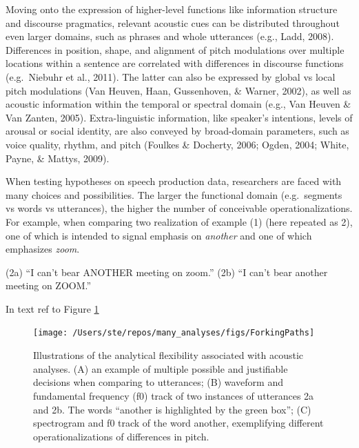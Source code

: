 \documentclass[
  english,
  man,floatsintext]{apa6}
\begin{document}
Moving onto the expression of higher-level functions like information structure and discourse pragmatics, relevant acoustic cues can be distributed throughout even larger domains, such as phrases and whole utterances (e.g., Ladd, 2008).
Differences in position, shape, and alignment of pitch modulations over multiple locations within a sentence are correlated with differences in discourse functions (e.g.~Niebuhr et al., 2011).
The latter can also be expressed by global vs local pitch modulations (Van Heuven, Haan, Gussenhoven, \& Warner, 2002), as well as acoustic information within the temporal or spectral domain (e.g., Van Heuven \& Van Zanten, 2005).
Extra-linguistic information, like speaker's intentions, levels of arousal or social identity, are also conveyed by broad-domain parameters, such as voice quality, rhythm, and pitch (Foulkes \& Docherty, 2006; Ogden, 2004; White, Payne, \& Mattys, 2009).

When testing hypotheses on speech production data, researchers are faced with many choices and possibilities.
The larger the functional domain (e.g.~segments vs words vs utterances), the higher the number of conceivable operationalizations.
For example, when comparing two realization of example (1) (here repeated as 2), one of which is intended to signal emphasis on \emph{another} and one of which emphasizes \emph{zoom}.

(2a) ``I can't bear ANOTHER meeting on zoom.''
(2b) ``I can't bear another meeting on ZOOM.''

In text ref to Figure \ref{fig:forkingPaths}



\begin{figure}
\texttt{[image: /Users/ste/repos/many\_analyses/figs/ForkingPaths]} \caption{Illustrations of the analytical flexibility associated with acoustic analyses. (A) an example of multiple possible and justifiable decisions when comparing to utterances; (B) waveform and fundamental frequency (f0) track of two instances of utterances 2a and 2b. The words ``another is highlighted by the green box''; (C) spectrogram and f0 track of the word another, exemplifying different operationalizations of differences in pitch.}\label{fig:forkingPaths}
\end{figure}
\end{document}
